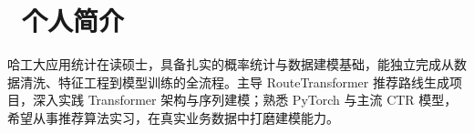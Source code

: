 \section{\faUser\ 个人简介}
哈工大应用统计在读硕士，具备扎实的概率统计与数据建模基础，能独立完成从数据清洗、特征工程到模型训练的全流程。主导 RouteTransformer 推荐路线生成项目，深入实践 Transformer 架构与序列建模；熟悉 PyTorch 与主流 CTR 模型，希望从事推荐算法实习，在真实业务数据中打磨建模能力。
